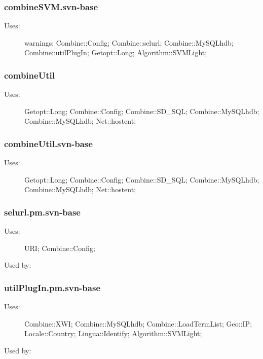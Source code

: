 \subsubsection{combineSVM.svn-base}
\begin{description}
\item[Uses:] warnings; Combine::Config; Combine::selurl; Combine::MySQLhdb; Combine::utilPlugIn; Getopt::Long; Algorithm::SVMLight; 

\end{description}
\subsubsection{combineUtil}
\begin{description}
\item[Uses:] Getopt::Long; Combine::Config; Combine::SD\_SQL; Combine::MySQLhdb; Combine::MySQLhdb; Net::hostent; 

\end{description}
\subsubsection{combineUtil.svn-base}
\begin{description}
\item[Uses:] Getopt::Long; Combine::Config; Combine::SD\_SQL; Combine::MySQLhdb; Combine::MySQLhdb; Net::hostent; 

\end{description}
\subsubsection{selurl.pm.svn-base}
\begin{description}
\item[Uses:] URI; Combine::Config; 

\item[Used by:] 

\end{description}
\subsubsection{utilPlugIn.pm.svn-base}
\begin{description}
\item[Uses:] Combine::XWI; Combine::MySQLhdb; Combine::LoadTermList; Geo::IP; Locale::Country; Lingua::Identify; Algorithm::SVMLight; 

\item[Used by:] 

\end{description}

